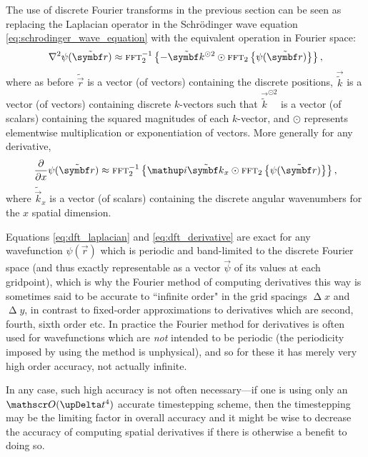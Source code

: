 The use of discrete Fourier transforms in the previous section can be seen as replacing the Laplacian operator in the Schr\"odinger wave equation \eqref{eq:schrodinger_wave_equation} with the equivalent operation in Fourier space:
\begin{align}\label{eq:dft_laplacian}
\nabla^2\psi(\tilde{\vec r}) \approx \fft_2^{-1}\left\{-\tilde{\vec k}^{\odot 2} \odot \fft_2\left\{\psi(\tilde{\vec r})\right\}\right\},
\end{align}
where as before $\tilde{\vec r}$ is a vector (of vectors) containing the discrete positions, $\vec{\tilde k}$ is a vector (of vectors) containing discrete $k$-vectors such that $\vec{\tilde k}^{\odot 2}$ is a vector (of scalars) containing the squared magnitudes of each $k$-vector, and $\odot$ represents elementwise multiplication or exponentiation of vectors. More generally for any derivative,
\begin{align}\label{eq:dft_derivative}
\pdv{x}\psi(\tilde{\vec r}) \approx \fft_2^{-1}\left\{\ii\tilde{\vec k}_x \odot \fft_2\left\{\psi(\tilde{\vec r})\right\}\right\},
\end{align}
where $\tilde{\vec k}_x$ is a vector (of scalars) containing the discrete angular wavenumbers for the $x$ spatial dimension.

Equations \eqref{eq:dft_laplacian} and \eqref{eq:dft_derivative} are exact for any wavefunction $\psi(\vec r)$ which is periodic and band-limited to the discrete Fourier space (and thus exactly representable as a vector $\vec \psi$ of its values at each gridpoint), which is why the Fourier method of computing derivatives this way is sometimes said to be accurate to ``infinite order" \cite{fornberg_pseudospectral_1987} in the grid spacings $\upDelta x$ and $\upDelta y$, in contrast to fixed-order approximations to derivatives which are second, fourth, sixth order etc. In practice the Fourier method for derivatives is often used for wavefunctions which are \emph{not} intended to be periodic (the periodicity imposed by using the method is unphysical), and so for these it has merely very high order accuracy, not actually infinite. 

In any case, such high accuracy is not often necessary---if one is using only an $\Ord{\upDelta t^4}$ accurate timestepping scheme, then the timestepping may be the limiting factor in overall accuracy and it might be wise to decrease the accuracy of computing spatial derivatives if there is otherwise a benefit to doing so.

